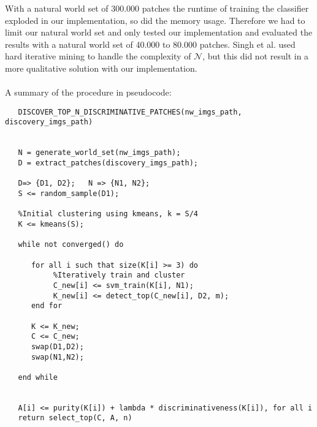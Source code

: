 With a natural world set of 300.000 patches the runtime of training the classifier exploded in our implementation, so did the
memory usage.
Therefore we had to limit our natural world set and only tested our implementation and evaluated the results with a 
natural world set of 40.000 to 80.000 patches. Singh et al. used hard iterative mining to handle the complexity of $\mathcal{N}$,
but this did not result in a more qualitative solution with our implementation.\\
\\
\newpage
A summary of the procedure in pseudocode:\\
\begin{lstlisting}
   DISCOVER_TOP_N_DISCRIMINATIVE_PATCHES(nw_imgs_path, discovery_imgs_path)


   N = generate_world_set(nw_imgs_path);
   D = extract_patches(discovery_imgs_path);
   
   D=> {D1, D2};   N => {N1, N2};
   S <= random_sample(D1); 
   
   %Initial clustering using kmeans, k = S/4
   K <= kmeans(S);
   
   while not converged() do
      
      for all i such that size(K[i] >= 3) do
           %Iteratively train and cluster
           C_new[i] <= svm_train(K[i], N1);
           K_new[i] <= detect_top(C_new[i], D2, m);
      end for
      
      K <= K_new;
      C <= C_new;
      swap(D1,D2);
      swap(N1,N2);
      
   end while
   
   
   A[i] <= purity(K[i]) + lambda * discriminativeness(K[i]), for all i
   return select_top(C, A, n)
\end{lstlisting}
